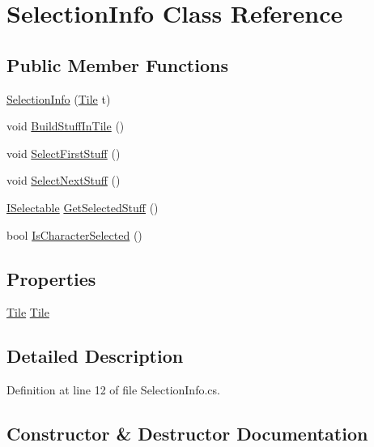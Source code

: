 \hypertarget{class_selection_info}{}\section{Selection\+Info Class Reference}
\label{class_selection_info}
\subsection*{Public Member Functions}
\begin{DoxyCompactItemize}
\item 
\hyperlink{class_selection_info_a92384db1940275aba11fad053ebafc7a}{Selection\+Info} (\hyperlink{class_tile}{Tile} t)
\item 
void \hyperlink{class_selection_info_a184257ca4a6f7d0c9e60c8815d8c4b72}{Build\+Stuff\+In\+Tile} ()
\item 
void \hyperlink{class_selection_info_ab8d67c80ab119f1363469558cd4b1a67}{Select\+First\+Stuff} ()
\item 
void \hyperlink{class_selection_info_ae8b10bdd6bacc96de5d35363ea1f15dd}{Select\+Next\+Stuff} ()
\item 
\hyperlink{interface_i_selectable}{I\+Selectable} \hyperlink{class_selection_info_a8ae5716ce65fb768ba41c5e2b86673db}{Get\+Selected\+Stuff} ()
\item 
bool \hyperlink{class_selection_info_ad0fa265814f54128149cf7fa09fbdef3}{Is\+Character\+Selected} ()
\end{DoxyCompactItemize}
\subsection*{Properties}
\begin{DoxyCompactItemize}
\item 
\hyperlink{class_tile}{Tile} \hyperlink{class_selection_info_a189d6ba2e1bce37b94947ba5974e5096}{Tile}
\end{DoxyCompactItemize}


\subsection{Detailed Description}


Definition at line 12 of file Selection\+Info.\+cs.



\subsection{Constructor \& Destructor Documentation}
\mbox{\label{class_selection_info_a92384db1940275aba11fad053ebafc7a}} 
